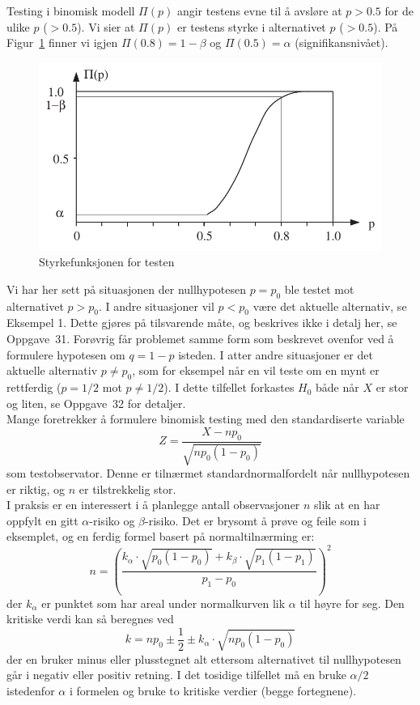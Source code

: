 \begin{eksempel}{Testing i binomisk modell}
\noindent $\Pi (p)$ angir testens evne til å avsløre at $p>0.5$ for de
ulike $p$ ($>0.5$). Vi sier at $\Pi (p)$ er testens styrke i
alternativet $p$ ($>0.5$). På Figur~\ref{fig:Styrkefunksjonen} finner vi igjen $\Pi (0.8)=1-
\beta$ og $\Pi(0.5)=\alpha$ (signifikansnivået).
\begin{figure}[ht]
\centering
\includegraphics[scale=0.8]{figurer/fig7_5.pdf}
\caption{Styrkefunksjonen for testen}
	\label{fig:Styrkefunksjonen}
\end{figure}
\end{eksempel}

Vi har her sett på situasjonen der nullhypotesen $p=p_0$ ble
testet mot alternativet $p>p_0$. I andre situasjoner vil $p<p_0$
være det aktuelle alternativ, se Eksempel 1. Dette gjøres på
tilsvarende måte, og beskrives ikke i detalj her, se Oppgave~31.
Forøvrig får problemet samme form som beskrevet ovenfor ved å
formulere hypotesen om $q=1-p$ isteden. I atter andre situasjoner
er det aktuelle alternativ $p\not= p_0$, som for eksempel når en
vil teste om en mynt er rettferdig ($p=1/2$ mot $p\not= 1/2$). I
dette tilfellet forkastes $H_0$ både når $X$ er stor og liten, se
Oppgave~32 for detaljer.\\

 Mange foretrekker å formulere binomisk testing
med den standardiserte variable
\[ Z=\frac{X-np_0}{\sqrt{np_0(1-p_0)}} \]
som testobservator. Denne er tilnærmet standardnormalfordelt når
nullhypotesen er riktig, og $n$ er tilstrekkelig stor. \\

I praksis er en interessert i å planlegge antall observasjoner $n$ slik at
en har oppfylt en gitt $\alpha$-risiko og $\beta$-risiko. Det er brysomt å prøve
og feile  som i eksemplet, og en ferdig formel basert på
normaltilnærming er:
\[ n=(\frac{k_{\alpha}\cdot \sqrt{p_0(1-p_0)} + k_{\beta}\cdot
           \sqrt{p_1(1-p_1)}}{p_1-p_0})^2        \]
der $k_\alpha$ er punktet som har areal under normalkurven lik $\alpha$
til høyre for seg. Den kritiske verdi kan så beregnes ved
\[ k=np_0 \pm \frac{1}{2} \pm k_{\alpha} \cdot \sqrt{np_0(1-p_0)} \]
der en bruker minus eller plusstegnet alt ettersom alternativet til 
nullhypotesen går i negativ eller positiv retning.
I det tosidige tilfellet må en bruke $\alpha/2$ istedenfor $\alpha$  i
formelen og bruke to kritiske verdier (begge fortegnene).\\

